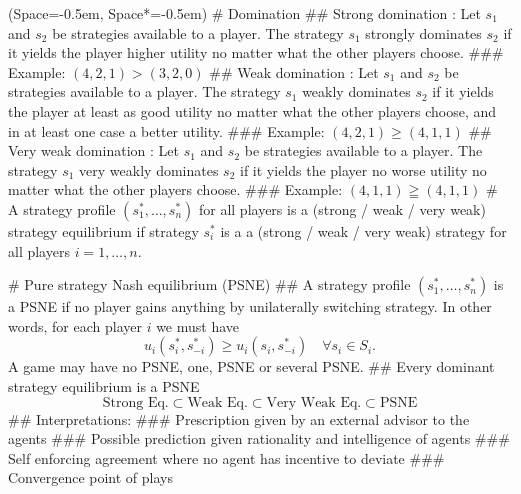 \documentclass[12pt, a4paper]{article}
\newcommand{\listSpace}{-0.5em}%
\begin{document}
\begin{easylist}[itemize]
	\ListProperties(Space=\listSpace, Space*=\listSpace)
	# Domination
	## Strong domination : Let $s_1$ and $s_2$ be strategies available to a player. The strategy $s_1$ strongly dominates $s_2$ if it yields the player higher utility no matter what the other players choose.
	### Example: $(4, 2, 1) > (3, 2, 0)$
	## Weak domination : Let $s_1$ and $s_2$ be strategies available to a player. The strategy $s_1$ weakly dominates $s_2$ if it yields the player at least as good utility no matter what the other players choose, and in at least one case a better utility.
	### Example: $(4, 2, 1) \geq (4, 1, 1)$
	## Very weak domination : Let $s_1$ and $s_2$ be strategies available to a player. The strategy $s_1$ very weakly dominates $s_2$ if it yields the player no worse utility no matter what the other players choose.
	### Example: $(4, 1, 1) \geqq (4, 1, 1)$
	# A strategy profile $(s_1^*, \ldots, s_n^*)$ for all players is a (strong / weak / very weak) strategy equilibrium if strategy $s_i^*$ is a a (strong / weak / very weak) strategy for all players $i =1, \ldots, n$.
	
	# Pure strategy Nash equilibrium (PSNE)
	## A strategy profile $(s_1^*, \ldots, s_n^*)$ is a PSNE if no player gains anything by unilaterally switching strategy.
	In other words, for each player $i$ we must have
	\begin{equation*}
		u_i\left( s_i^*, s_{-i}^* \right)
		\geq 
		u_i\left( s_i, s_{-i}^* \right)
		\quad
		\forall s_i \in S_i.
	\end{equation*}
	A game may have no PSNE, one, PSNE or several PSNE.
	## Every dominant strategy equilibrium is a PSNE
	\begin{equation}
		\text{Strong Eq.}
		\subset
		\text{Weak Eq.}
		\subset
		\text{Very Weak Eq.}
		\subset
		\text{PSNE}
	\end{equation}
	## Interpretations:
	### Prescription given by an external advisor to the agents
	### Possible prediction given rationality and intelligence of agents
	### Self enforcing agreement where no agent has incentive to deviate
	### Convergence point of plays
	

\end{easylist}
\end{document}
